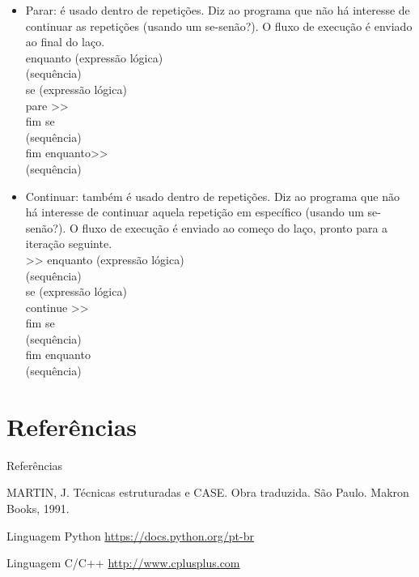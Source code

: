 \documentclass{beamer}%
\def\azul{\color{blue!90!black}}
\begin{document}
\begin{frame}
 \begin{itemize}\justifying
\item Parar: é usado dentro de repetições. Diz ao programa que não
há interesse de continuar as repetições (usando um se-senão?). O
fluxo de execução é enviado ao final do laço.\\
{\azul
enquanto (expressão lógica)\\
\qquad (sequência)\\
\qquad se (expressão lógica)\\
\qquad\qquad pare >>\\
\qquad fim se\\
\qquad (sequência)\\
fim enquanto>>\\
(sequência)
}
\end{itemize}

\end{frame}


\begin{frame}
 \begin{itemize}\justifying
\item Continuar: também é usado dentro de repetições. Diz ao programa que não
há interesse de continuar aquela repetição em específico (usando um se-senão?).
O fluxo de execução é enviado ao começo do laço, pronto para a
iteração seguinte.\\
{\azul
>> enquanto (expressão lógica)\\
\qquad (sequência)\\
\qquad se (expressão lógica)\\
\qquad\qquad continue >>\\
\qquad fim se\\
\qquad (sequência)\\
fim enquanto\\
(sequência)
}
\end{itemize}

\end{frame}




\section{Referências}
\begin{frame}{Referências}
\footnotesize{
\begin{thebibliography}{99}
 MARTIN, J. Técnicas estruturadas e
CASE. Obra traduzida. São Paulo. Makron Books, 1991.

 Linguagem Python
\url{https://docs.python.org/pt-br}

 Linguagem C/C++
\url{http://www.cplusplus.com}
\end{thebibliography}
}
\end{frame}
\end{document}
